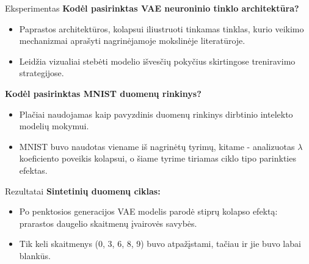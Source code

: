 \documentclass{beamer}
\begin{document}
\begin{frame}{Eksperimentas}
    \textbf{Kodėl pasirinktas VAE neuroninio tinklo architektūra?}
    \begin{itemize}
        \item Paprastos architektūros, kolapsui iliustruoti tinkamas tinklas, kurio veikimo mechanizmai aprašyti nagrinėjamoje mokslinėje literatūroje.
        \item Leidžia vizualiai stebėti modelio išvesčių pokyčius skirtingose treniravimo strategijose.
    \end{itemize}

    \textbf{Kodėl pasirinktas MNIST duomenų rinkinys?}
    \begin{itemize}
        \item Plačiai naudojamas kaip pavyzdinis duomenų rinkinys dirbtinio intelekto modelių mokymui.
        \item MNIST buvo naudotas viename iš nagrinėtų tyrimų, kitame - analizuotas \(\lambda\) koeficiento poveikis kolapsui, o šiame tyrime tiriamas ciklo tipo parinkties efektas.
    \end{itemize}
\end{frame}


\begin{frame}{Rezultatai}
     \textbf{Sintetinių duomenų ciklas:}
        \begin{itemize}
            \item Po penktosios generacijos VAE modelis parodė stiprų kolapso efektą: prarastos daugelio skaitmenų įvairovės savybės.
            \item Tik keli skaitmenys (0, 3, 6, 8, 9) buvo atpažįstami, tačiau ir jie buvo labai blankūs.
        \end{itemize}
\end{frame}
\end{document}
